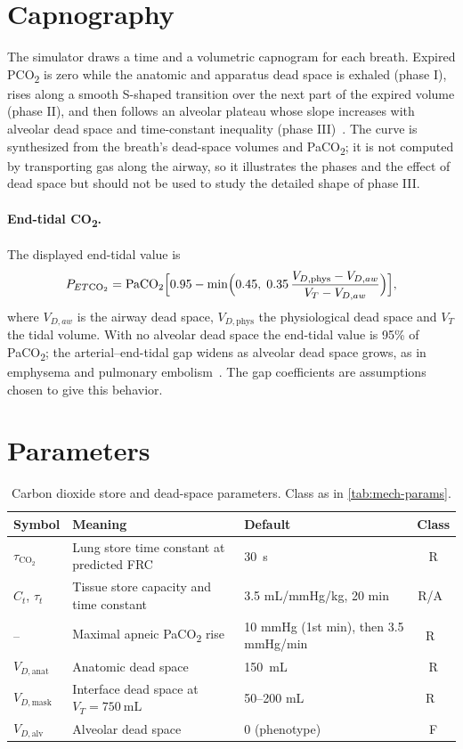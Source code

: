 \section{Capnography}
\label{sec:co2-capno}
The simulator draws a time and a volumetric capnogram for each breath. Expired PCO\textsubscript{2} is zero while the anatomic and apparatus dead space is exhaled (phase I), rises along a smooth S-shaped transition over the next part of the expired volume (phase II), and then follows an alveolar plateau whose slope increases with alveolar dead space and time-constant inequality (phase III)~\citep{fletcher1981}. The curve is synthesized from the breath's dead-space volumes and PaCO\textsubscript{2}; it is not computed by transporting gas along the airway, so it illustrates the phases and the effect of dead space but should not be used to study the detailed shape of phase III.

\paragraph{End-tidal CO\textsubscript{2}.} The displayed end-tidal value is
\begin{equation}
P_{ET\mathrm{CO_2}}=\mathrm{PaCO_2}\Bigl[0.95-\min\Bigl(0.45,\;0.35\,\frac{V_{D,\mathrm{phys}}-V_{D,aw}}{V_T-V_{D,aw}}\Bigr)\Bigr],
\label{eq:co2-etco2}
\end{equation}
where $V_{D,aw}$ is the airway dead space, $V_{D,\mathrm{phys}}$ the physiological dead space and $V_T$ the tidal volume. With no alveolar dead space the end-tidal value is 95\% of PaCO\textsubscript{2}; the arterial--end-tidal gap widens as alveolar dead space grows, as in emphysema and pulmonary embolism~\citep{fletcher1981}. The gap coefficients are assumptions chosen to give this behavior.

\section{Parameters}
\begin{table}[ht]
\centering
\caption{Carbon dioxide store and dead-space parameters. Class as in \cref{tab:mech-params}.}
\label{tab:co2-params}
\small
\begin{tabularx}{\linewidth}{@{}l X l c@{}}
\toprule
Symbol & Meaning & Default & Class \\
\midrule
$\tau_{\mathrm{CO_2}}$ & Lung store time constant at predicted FRC & \SI{30}{\second} & R \\
$C_t$, $\tau_t$ & Tissue store capacity and time constant & 3.5 mL/mmHg/kg, 20 min & R/A~\citep{farhi1955} \\
-- & Maximal apneic PaCO\textsubscript{2} rise & 10 mmHg (1st min), then 3.5 mmHg/min & R~\citep{stock1988} \\
$V_{D,\mathrm{anat}}$ & Anatomic dead space & \SI{150}{\milli\liter} & R \\
$V_{D,\mathrm{mask}}$ & Interface dead space at $V_T = \SI{750}{\milli\liter}$ & 50--200 mL & R~\citep{fodil2011} \\
$V_{D,\mathrm{alv}}$ & Alveolar dead space & 0 (phenotype) & F \\
\bottomrule
\end{tabularx}
\end{table}

